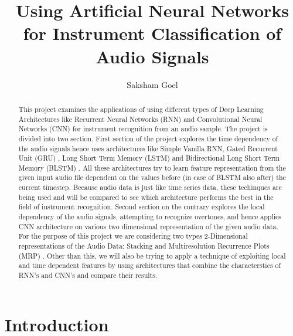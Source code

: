 \documentclass[letterpaper, 12 pt, conference]{ieeeconf}  %
\title{\LARGE \bf
Using Artificial Neural Networks for Instrument Classification of Audio Signals
}
\author{Saksham Goel%
}
\begin{document}
\maketitle
\thispagestyle{empty}
\pagestyle{empty}

\begin{abstract}
This project examines the applications of using different types of Deep Learning Architectures like Recurrent Neural Networks (RNN) and Convolutional Neural Networks (CNN) for instrument recognition from an audio sample. The project is divided into two section. First section of the project explores the time dependency of the audio signals hence uses architectures like Simple Vanilla RNN, Gated Recurrent Unit (GRU) \cite{gru_translation}, Long Short Term Memory (LSTM) \cite{lstm_sequence_modelling} \cite{lstm_music_genre} and Bidirectional Long Short Term Memory (BLSTM) \cite{bidirectional_lstm_speech}. All these architectures try to learn feature representation from the given input audio file dependent on the values before (in case of BLSTM also after) the current timestep. Because audio data is just like time series data, these techinques are being used and will be compared to see which architecture performs the best in the field of instrument recognition. Second section on the contrary explores the local dependency of the audio signals, attempting to recognize overtones, and hence applies CNN architecture on various two dimensional representation of the given audio data. For the purpose of this project we are considering two types 2-Dimensional representations of the Audio Data: Stacking and Multiresolution Recurrence Plots (MRP) \cite{cnn_music_mrp}. Other than this, we will also be trying to apply a technique of exploiting local and time dependent features by using architectures that combine the characterstics of RNN's and CNN's \cite{cnn_rnn_sleep_staging} \cite{crnn} and compare their results.
\end{abstract}




\section{\textbf{Introduction}}
\end{document}
